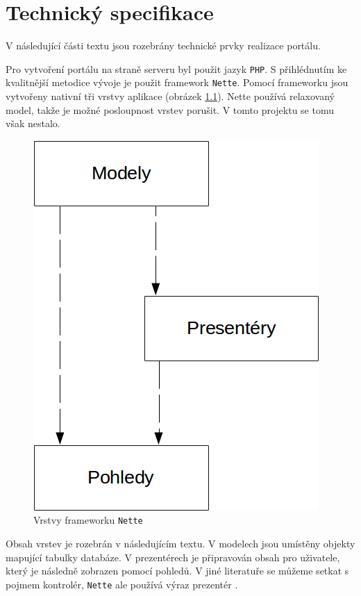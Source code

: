 \documentclass[a4paper,10pt]{report}
\begin{document}
\chapter{Technický specifikace}

V následující části textu jsou rozebrány technické prvky realizace portálu.

Pro vytvoření portálu na straně serveru byl použit jazyk \texttt{PHP}. S přihlédnutím ke kvalitnější metodice vývoje je použit framework \texttt{Nette}. Pomocí frameworku jsou vytvořeny nativní tři vrstvy aplikace (obrázek \ref{nette}). Nette používá relaxovaný model, takže je možné posloupnost vrstev porušit. V tomto projektu se tomu však nestalo.

\begin{figure}[H]
  \centering
	\includegraphics[scale=0.5]{nette.png} 
  \caption{Vrstvy frameworku \texttt{Nette}}
  \label{nette}
\end{figure}

Obsah vrstev je rozebrán v následujícím textu. V modelech jsou umístěny objekty mapující tabulky databáze. V prezentérech je připravován obsah pro uživatele, který je následně zobrazen pomocí pohledů. V jiné literatuře se můžeme setkat s pojmem kontrolér, \texttt{Nette} ale používá výraz prezentér \cite{nettfr}. 
\end{document}
